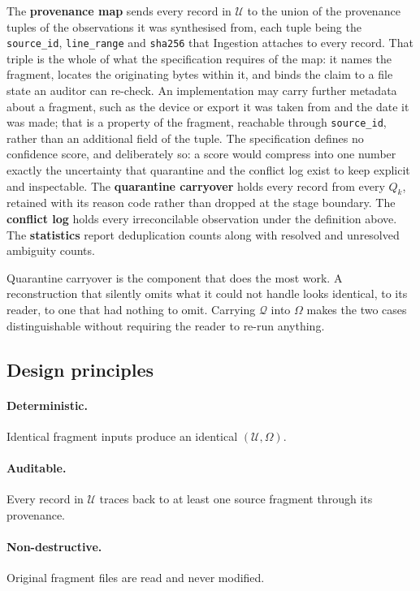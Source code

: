 The \textbf{provenance map} sends every record in $\mathcal{U}$ to the union of
the provenance tuples of the observations it was synthesised from, each tuple
being the \texttt{source\_id}, \texttt{line\_range} and \texttt{sha256} that
Ingestion attaches to every record. That triple is the whole of what the
specification requires of the map: it names the fragment, locates the
originating bytes within it, and binds the claim to a file state an auditor can
re-check. An implementation may carry further metadata about a fragment, such as
the device or export it was taken from and the date it was made; that is a
property of the fragment, reachable through \texttt{source\_id}, rather than an
additional field of the tuple. The specification defines no confidence score,
and deliberately so: a score would compress into one number exactly the
uncertainty that quarantine and the conflict log exist to keep explicit and
inspectable. The \textbf{quarantine
carryover} holds every record from every $Q_k$, retained with its reason code
rather than dropped at the stage boundary. The \textbf{conflict log} holds every
irreconcilable observation under the definition above. The \textbf{statistics}
report deduplication counts along with resolved and unresolved ambiguity counts.

Quarantine carryover is the component that does the most work. A reconstruction
that silently omits what it could not handle looks identical, to its reader, to
one that had nothing to omit. Carrying $\mathcal{Q}$ into $\Omega$ makes the two
cases distinguishable without requiring the reader to re-run anything.

\subsection{Design principles}
\label{sec:carta:principles}

\paragraph{Deterministic.}
Identical fragment inputs produce an identical $(\mathcal{U}, \Omega)$.

\paragraph{Auditable.}
Every record in $\mathcal{U}$ traces back to at least one source fragment through
its provenance.

\paragraph{Non-destructive.}
Original fragment files are read and never modified.

